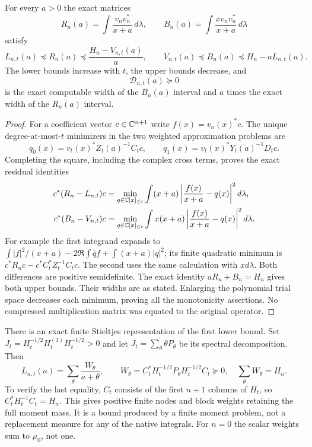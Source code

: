\documentclass[11pt]{article}
\begin{document}
\begin{mmnativetheorem}
\label{mmnative:thm:finite}
For every $a>0$ the exact matrices
\[
 R_n(a)=\int\frac{v_nv_n^*}{x+a}\,d\lambda,
 \qquad B_n(a)=\int\frac{xv_nv_n^*}{x+a}\,d\lambda
\]
satisfy
\begin{equation}\label{mmnative:eq:bounds}
 \boxed{L_{n,t}(a)\preceq R_n(a)
       \preceq\frac{H_n-V_{n,t}(a)}a,\qquad
 V_{n,t}(a)\preceq B_n(a)\preceq H_n-aL_{n,t}(a).}
\end{equation}
The lower bounds increase with $t$, the upper bounds decrease, and
\begin{equation}\label{mmnative:eq:gap}
 \mathcal D_{n,t}(a)\succeq0
\end{equation}
is the exact computable width of the $B_n(a)$ interval and $a$ times
the exact width of the $R_n(a)$ interval.
\end{mmnativetheorem}
\begin{proof}
For a coefficient vector $c\in\mathbb C^{n+1}$ write
$f(x)=v_n(x)^*c$.  The unique degree-at-most-$t$ minimizers in the
two weighted approximation problems are
\[
 q_0(x)=v_t(x)^*Z_t(a)^{-1}C_tc,
 \qquad q_1(x)=v_t(x)^*Y_t(a)^{-1}D_tc.
\]
Completing the square, including the complex cross terms, proves
the exact residual identities
\begin{align}
 c^*(R_n-L_{n,t})c
 &=\min_{q\in\mathbb C[x]_{\le t}}
   \int(x+a)\left|\frac{f(x)}{x+a}-q(x)\right|^2d\lambda,
 \label{mmnative:eq:residual0}\\
 c^*(B_n-V_{n,t})c
 &=\min_{q\in\mathbb C[x]_{\le t}}
   \int x(x+a)\left|\frac{f(x)}{x+a}-q(x)\right|^2d\lambda.
 \label{mmnative:eq:residual1}
\end{align}
For example the first integrand expands to
$\int|f|^2/(x+a)-2\Re\int\bar qf+\int(x+a)|q|^2$;
its finite quadratic minimum is $c^*R_nc-c^*C_t^*Z_t^{-1}C_tc$.
The second uses the same calculation with $xd\lambda$.
Both differences are positive semidefinite.  The exact identity
$aR_n+B_n=H_n$ gives both upper bounds.  Their widths are as stated.
Enlarging the polynomial trial space decreases each minimum, proving
all the monotonicity assertions.  No compressed multiplication matrix
was equated to the original operator.
\end{proof}

There is an exact finite Stieltjes representation of the first lower
bound.  Set $J_t=H_t^{-1/2}H_t^{(1)}H_t^{-1/2}>0$ and let
$J_t=\sum_\theta\theta P_\theta$ be its spectral decomposition.  Then
\begin{equation}\label{mmnative:eq:blockstieltjes}
 L_{n,t}(a)=\sum_\theta\frac{W_\theta}{a+\theta},\qquad
 W_\theta=C_t^*H_t^{-1/2}P_\theta H_t^{-1/2}C_t\succeq0,
 \quad\sum_\theta W_\theta=H_n.
\end{equation}
To verify the last equality, $C_t$ consists of the first $n+1$
columns of $H_t$, so $C_t^*H_t^{-1}C_t=H_n$.  This gives positive
finite nodes and block weights retaining the full moment mass.  It is
a bound produced by a finite moment problem, not a replacement measure
for any of the native integrals.  For $n=0$ the scalar weights sum to
$\mu_0$, not one.
\end{document}
